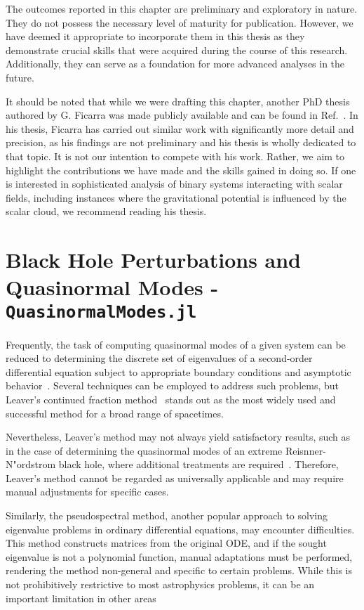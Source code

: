 The outcomes reported in this chapter are preliminary and exploratory in nature. They do not possess the necessary level of maturity for publication. However, we have deemed it appropriate to incorporate them in this thesis as they demonstrate crucial skills that were acquired during the course of this research. Additionally, they can serve as a foundation for more advanced analyses in the future.

It should be noted that while we were drafting this chapter, another PhD thesis authored by G. Ficarra was made publicly available and can be found in Ref.~\cite{Ficarra2023}. In his thesis, Ficarra has carried out similar work with significantly more detail and precision, as his findings are not preliminary and his thesis is wholly dedicated to that topic. It is not our intention to compete with his work. Rather, we aim to highlight the contributions we have made and the skills gained in doing so. If one is interested in sophisticated analysis of binary systems interacting with scalar fields, including instances where the gravitational potential is influenced by the scalar cloud, we recommend reading his thesis.

\section{Black Hole Perturbations and Quasinormal Modes - \texttt{QuasinormalModes.jl}}

Frequently, the task of computing quasinormal modes of a given system can be reduced to determining the discrete set of eigenvalues of a second-order differential equation subject to appropriate boundary conditions and asymptotic behavior~\cite{review3}. Several techniques can be employed to address such problems, but Leaver's continued fraction method~\cite{Leaver1985} stands out as the most widely used and successful method for a broad range of spacetimes.

Nevertheless, Leaver's method may not always yield satisfactory results, such as in the case of determining the quasinormal modes of an extreme Reisnner-N"ordstrom black hole, where additional treatments are required~\cite{PhysRevD.93.064062}. Therefore, Leaver's method cannot be regarded as universally applicable and may require manual adjustments for specific cases.

Similarly, the pseudospectral method, another popular approach to solving eigenvalue problems in ordinary differential equations, may encounter difficulties. This method constructs matrices from the original ODE, and if the sought eigenvalue is not a polynomial function, manual adaptations must be performed, rendering the method non-general and specific to certain problems. While this is not prohibitively restrictive to most astrophysics problems, it can be an important limitation in other areas

